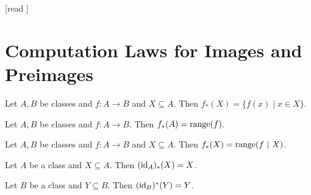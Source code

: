 \documentclass[10pt]{article}
\begin{document}
  \begin{imports}
    \begin{forthel}
      [read ]
    \end{forthel}
  \end{imports}


  \section*{Computation Laws for Images and Preimages}

  \begin{forthel}
    \begin{proposition}[id=FOUNDATIONS_07_5919649206108160,printid]
      Let $A, B$ be classes and $f : A \to B$ and $X \subseteq A$.
      Then $f_{*}(X) = \{ f(x) \mid x \in X \}$.
    \end{proposition}
  \end{forthel}

  \begin{forthel}
    \begin{corollary}[id=FOUNDATIONS_07_5543924730953728,printid]
      Let $A, B$ be classes and $f : A \to B$.
      Then $f_{*}(A) = \textrm{range}(f)$.
    \end{corollary}
  \end{forthel}

  \begin{forthel}
    \begin{corollary}[id=FOUNDATIONS_07_1818812171157504,printid]
      Let $A, B$ be classes and $f : A \to B$ and $X \subseteq A$.
      Then $f_{*}(X) = \textrm{range}(f \restriction X)$.
    \end{corollary}
  \end{forthel}

  \begin{forthel}
    \begin{proposition}[id=FOUNDATIONS_07_911395830890496,printid]
      Let $A$ be a class and $X \subseteq A$.
      Then $(\textrm{id}_{A})_{*}(X) = X$.
    \end{proposition}
  \end{forthel}

  \begin{forthel}
    \begin{proposition}[id=FOUNDATIONS_07_3349817830932480,printid]
      Let $B$ be a class and $Y \subseteq B$.
      Then $(\textrm{id}_{B})^{*}(Y) = Y$.
    \end{proposition}
  \end{forthel}
\end{document}
